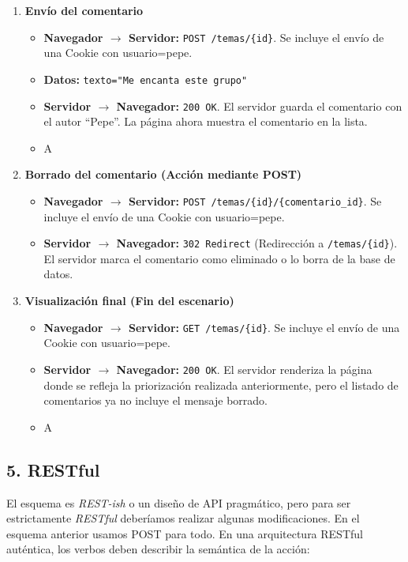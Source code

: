 \begin{enumerate}
  \item \textbf{Envío del comentario}
  \begin{itemize}
    \item \textbf{Navegador $\rightarrow$ Servidor:} \texttt{POST /temas/\{id\}}. Se incluye el envío de una Cookie con usuario=pepe.
    \item \textbf{Datos:} \texttt{texto="Me encanta este grupo"}
    \item \textbf{Servidor $\rightarrow$ Navegador:} \texttt{200 OK}. El servidor guarda el comentario con el autor ``Pepe''. La página ahora muestra el comentario en la lista.
    \item \textcircled{A}
  \end{itemize}

  \item \textbf{Borrado del comentario (Acción mediante POST)}
  \begin{itemize}
    \item \textbf{Navegador $\rightarrow$ Servidor:} \texttt{POST /temas/\{id\}/\{comentario\_id\}}.  Se incluye el envío de una Cookie con usuario=pepe.
    \item \textbf{Servidor $\rightarrow$ Navegador:} \texttt{302 Redirect} (Redirección a \texttt{/temas/\{id\}}). El servidor marca el comentario como eliminado o lo borra de la base de datos.
  \end{itemize}

  \item \textbf{Visualización final (Fin del escenario)}
  \begin{itemize}
    \item \textbf{Navegador $\rightarrow$ Servidor:} \texttt{GET /temas/\{id\}}.  Se incluye el envío de una Cookie con usuario=pepe.
    \item \textbf{Servidor $\rightarrow$ Navegador:} \texttt{200 OK}. El servidor renderiza la página donde se refleja la priorización realizada anteriormente, pero el listado de comentarios ya no incluye el mensaje borrado.
    \item \textcircled{A}
  \end{itemize}
\end{enumerate}

\subsection*{5. RESTful}

El esquema es \emph{REST-ish} o un diseño de API pragmático, pero para ser estrictamente \emph{RESTful} deberíamos realizar algunas modificaciones. En el esquema anterior usamos POST para todo. En una arquitectura RESTful auténtica, los verbos deben describir la semántica de la acción:


